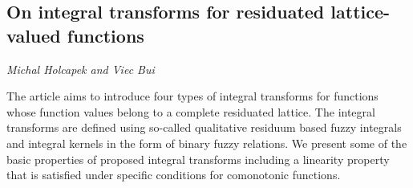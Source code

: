 \documentclass[../booklet.tex]{subfiles}
\begin{document}
\subsection[On integral transforms for residuated lattice-valued functions. {\it Michal Holcapek and Viec Bui}]{On integral transforms for residuated lattice-valued functions}
 

\begin{center}
  {\it Michal Holcapek and Viec Bui}
\end{center}

\vskip 0.8cm


The article aims to introduce four types of integral transforms for functions whose function values belong to a complete residuated lattice. The integral transforms are defined using so-called qualitative residuum based fuzzy integrals and integral kernels in the form of binary fuzzy relations. We present some of the basic properties of proposed integral transforms including a linearity property that is satisfied under specific conditions for comonotonic functions. 

\end{document}

